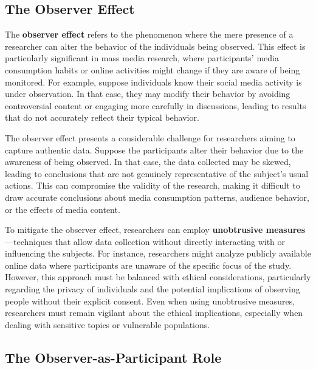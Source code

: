 \documentclass[
]{book}
\begin{document}
\subsection*{The Observer Effect}\label{the-observer-effect}

The \textbf{observer effect} refers to the phenomenon where the mere presence of a researcher can alter the behavior of the individuals being observed. This effect is particularly significant in mass media research, where participants' media consumption habits or online activities might change if they are aware of being monitored. For example, suppose individuals know their social media activity is under observation. In that case, they may modify their behavior by avoiding controversial content or engaging more carefully in discussions, leading to results that do not accurately reflect their typical behavior.

The observer effect presents a considerable challenge for researchers aiming to capture authentic data. Suppose the participants alter their behavior due to the awareness of being observed. In that case, the data collected may be skewed, leading to conclusions that are not genuinely representative of the subject's usual actions. This can compromise the validity of the research, making it difficult to draw accurate conclusions about media consumption patterns, audience behavior, or the effects of media content.

To mitigate the observer effect, researchers can employ \textbf{unobtrusive measures}---techniques that allow data collection without directly interacting with or influencing the subjects. For instance, researchers might analyze publicly available online data where participants are unaware of the specific focus of the study. However, this approach must be balanced with ethical considerations, particularly regarding the privacy of individuals and the potential implications of observing people without their explicit consent. Even when using unobtrusive measures, researchers must remain vigilant about the ethical implications, especially when dealing with sensitive topics or vulnerable populations.

\subsection*{The Observer-as-Participant Role}\label{the-observer-as-participant-role}
\end{document}

